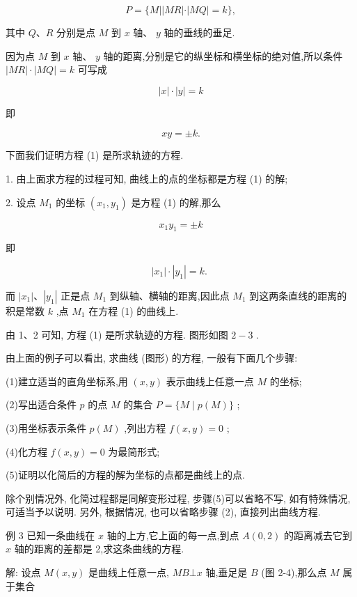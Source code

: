 \documentclass[lang=cn,newtx,12pt,scheme=chinese]{elegantbook}
\begin{document}
\[
  P = \{ M\left| \right| {MR}\left| \cdot \right| {MQ} \mid = k\} ,
\]

其中 \(Q\text{、}R\) 分别是点 \(M\) 到 \(x\) 轴、 \(y\) 轴的垂线的垂足.

因为点 \(M\) 到 \(x\) 轴、 \(y\) 轴的距离,分别是它的纵坐标和横坐标的绝对值,所以条件 \(\left| {MR}\right| \cdot \left| {MQ}\right| = k\) 可写成

\[
  \left| x\right| \cdot \left| y\right| = k
\]

即

\[
    {xy} = \pm k\text{.} \tag{1}
\]

下面我们证明方程 (1) 是所求轨迹的方程.

1. 由上面求方程的过程可知, 曲线上的点的坐标都是方程 (1) 的解;

2. 设点 \({M}_{1}\) 的坐标 \(\left( {{x}_{1},{y}_{1}}\right)\) 是方程 (1) 的解,那么

\[
    {x}_{1}{y}_{1} = \pm k
\]

即

\[
  \left| {x}_{1}\right| \cdot \left| {y}_{1}\right| = k\text{. }
\]

而 \(\left| {x}_{1}\right| \text{、}\left| {y}_{1}\right|\) 正是点 \({M}_{1}\) 到纵轴、横轴的距离,因此点 \({M}_{1}\) 到这两条直线的距离的积是常数 \(k\) ,点 \({M}_{1}\) 在方程 (1) 的曲线上.

由 1、2 可知, 方程 (1) 是所求轨迹的方程. 图形如图 \(2 - 3\) .

由上面的例子可以看出, 求曲线 (图形) 的方程, 一般有下面几个步骤:

(1)建立适当的直角坐标系,用 \(\left( {x,y}\right)\) 表示曲线上任意一点 \(M\) 的坐标;

(2)写出适合条件 \(p\) 的点 \(M\) 的集合 \(P = \{ M \mid p\left( M\right) \}\) ;

(3)用坐标表示条件 \(p\left( M\right)\) ,列出方程 \(f\left( {x,y}\right) = 0\) ;

(4)化方程 \(f\left( {x,y}\right) = 0\) 为最简形式;

(5)证明以化简后的方程的解为坐标的点都是曲线上的点.

除个别情况外, 化简过程都是同解变形过程, 步骤(5)可以省略不写, 如有特殊情况, 可适当予以说明. 另外, 根据情况, 也可以省略步骤 (2), 直接列出曲线方程.

例 3 已知一条曲线在 \(x\) 轴的上方,它上面的每一点,到点 \(A\left( {0,2}\right)\) 的距离减去它到 \(x\) 轴的距离的差都是 2,求这条曲线的方程.

解: 设点 \(M\left( {x,y}\right)\) 是曲线上任意一点, \({MB} \bot x\) 轴,垂足是 \(B\) (图 2-4),那么点 \(M\) 属于集合
\end{document}

